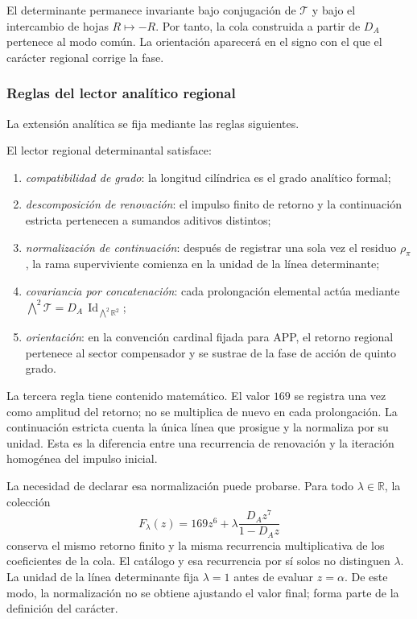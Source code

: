 El determinante permanece invariante bajo conjugación de
\(\mathcal T\) y bajo el intercambio de hojas \(R\mapsto-R\). Por tanto, la
cola construida a partir de \(D_A\) pertenece al modo común. La orientación
aparecerá en el signo con el que el carácter regional corrige la fase.

\subsubsection{Reglas del lector analítico regional}

La extensión analítica se fija mediante las reglas siguientes.

\begin{definition}
\label{p12-83-c13-s3:def:lector-regional-determinantal}
El lector regional determinantal satisface:
\begin{enumerate}
  \item \emph{compatibilidad de grado}: la longitud cilíndrica es el grado
  analítico formal;
  \item \emph{descomposición de renovación}: el impulso finito de retorno y
  la continuación estricta pertenecen a sumandos aditivos distintos;
  \item \emph{normalización de continuación}: después de registrar una sola
  vez el residuo \(\rho_\pi\), la rama superviviente comienza en la unidad de
  la línea determinante;
  \item \emph{covariancia por concatenación}: cada prolongación elemental
  actúa mediante
  \(\bigwedge^2\mathcal T=D_A\,\operatorname{Id}_{\bigwedge^2\mathbb R^2}\);
  \item \emph{orientación}: en la convención cardinal fijada para APP, el
  retorno regional pertenece al sector compensador y se sustrae de la fase
  de acción de quinto grado.
\end{enumerate}
\end{definition}

La tercera regla tiene contenido matemático. El valor \(169\) se registra
una vez como amplitud del retorno; no se multiplica de nuevo en cada
prolongación. La continuación estricta cuenta la única línea que prosigue y
la normaliza por su unidad. Esta es la diferencia entre una recurrencia de
renovación y la iteración homogénea del impulso inicial.

La necesidad de declarar esa normalización puede probarse. Para todo
\(\lambda\in\mathbb R\), la colección
\[
F_\lambda(z)
=169z^6+\lambda\frac{D_Az^7}{1-D_Az}
\]
conserva el mismo retorno finito y la misma recurrencia multiplicativa de
los coeficientes de la cola. El catálogo y esa recurrencia por sí solos no distinguen
\(\lambda\). La unidad de la línea determinante fija
\(\lambda=1\) antes de evaluar \(z=\alpha\). De este modo, la normalización
no se obtiene ajustando el valor final; forma parte de la definición del
carácter.
